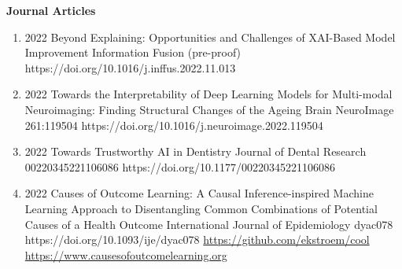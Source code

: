 \documentclass[10pt,a4paper]{article} %
\begin{document}
\headedsection %
{\bf Journal Articles}{ }
{
\begin{enumerate}

    \item {}
                            {2022}
                            {Beyond Explaining: Opportunities and Challenges of XAI-Based Model Improvement}
                            {Information Fusion}
                            {(pre-proof)}
                            {https://doi.org/10.1016/j.inffus.2022.11.013}


    \item {}
                            {2022}
                            {Towards the Interpretability of Deep Learning Models for Multi-modal Neuroimaging: Finding Structural Changes of the Ageing Brain}
                            {NeuroImage}
                            {261:119504}
                            {https://doi.org/10.1016/j.neuroimage.2022.119504}


    \item {}
                        {2022}
                        {Towards Trustworthy AI in Dentistry}
                        {Journal of Dental Research}
                        {00220345221106086}
                        {https://doi.org/10.1177/00220345221106086}


    \item {}
                        {2022}
                        {Causes of Outcome Learning: A Causal Inference-inspired Machine Learning Approach to Disentangling Common Combinations of Potential Causes of a Health Outcome}
                        {International Journal of Epidemiology}
                        {dyac078}
                        {https://doi.org/10.1093/ije/dyac078}
                        {\href{https://github.com/ekstroem/cool}{https://github.com/ekstroem/cool}\\
                         \href{https://www.causesofoutcomelearning.org}{https://www.causesofoutcomelearning.org}
                        }


\end{enumerate}}
\end{document}
